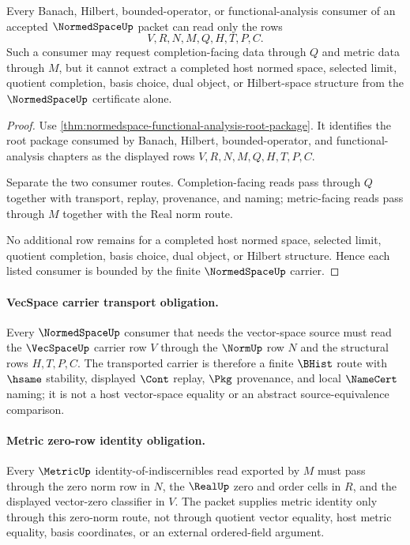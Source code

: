 \begin{theorem}
\label{thm:normedspace-banach-consumer-nonescape}
Every Banach, Hilbert, bounded-operator, or functional-analysis consumer of an
accepted $\NormedSpaceUp$ packet can read only the rows
$$
V,R,N,M,Q,H,T,P,C .
$$
Such a consumer may request completion-facing data through $Q$ and metric data
through $M$, but it cannot extract a completed host normed space, selected
limit, quotient completion, basis choice, dual object, or Hilbert-space
structure from the $\NormedSpaceUp$ certificate alone.
\end{theorem}
\begin{proof}
Use \autoref{thm:normedspace-functional-analysis-root-package}. It identifies
the root package consumed by Banach, Hilbert, bounded-operator, and
functional-analysis chapters as the displayed rows $V,R,N,M,Q,H,T,P,C$.

Separate the two consumer routes. Completion-facing reads pass through $Q$
together with transport, replay, provenance, and naming; metric-facing reads
pass through $M$ together with the Real norm route.

No additional row remains for a completed host normed space, selected limit,
quotient completion, basis choice, dual object, or Hilbert structure. Hence
each listed consumer is bounded by the finite $\NormedSpaceUp$ carrier.
\end{proof}

\paragraph{VecSpace carrier transport obligation.}
Every $\NormedSpaceUp$ consumer that needs the vector-space source must read the $\VecSpaceUp$ carrier row $V$ through the $\NormUp$ row $N$ and the structural rows $H,T,P,C$. The transported carrier is therefore a finite $\BHist$ route with $\hsame$ stability, displayed $\Cont$ replay, $\Pkg$ provenance, and local $\NameCert$ naming; it is not a host vector-space equality or an abstract source-equivalence comparison.

\paragraph{Metric zero-row identity obligation.}
Every $\MetricUp$ identity-of-indiscernibles read exported by $M$ must pass through the zero norm row in $N$, the $\RealUp$ zero and order cells in $R$, and the displayed vector-zero classifier in $V$. The packet supplies metric identity only through this zero-norm route, not through quotient vector equality, host metric equality, basis coordinates, or an external ordered-field argument.

